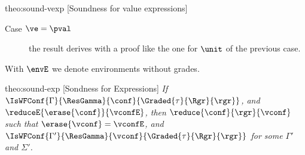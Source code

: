 \begin{proofOf}{theo:sound-vexp} [Soundness for value expressions]
\begin{description}
%

  \item [Case $\ve=\pval$] the result derives with a proof like the one for $\unit$ of the previous case.
\end{description}
\end{proofOf}

With $\envE$ we denote environments without grades.

\begin{proofOf}{theo:sound-exp} [Sondness for Expressions] {\em If $\IsWFConf{\Gamma}{\ResGamma}{\conf}{\Graded{\tau}{\Rgr}{\rgr}}$, and
$\reduceE{\erase{\conf}}{\vconfE}$, then $\reduce{\conf}{\rgr}{\vconf}$ such that $\erase{\vconf}=\vconfE$, and $\IsWFConf{\Gamma'}{\ResGamma}{\vconf}{\Graded{\tau}{\Rgr}{\rgr}}$ for some $\Gamma'$ and $\Sigma'$.
}


\end{proofOf}
